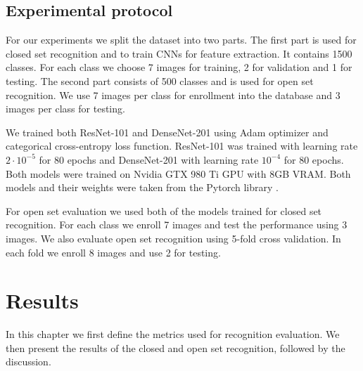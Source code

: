 \documentclass[9pt]{IEEEtran}
\begin{document}
\subsection{Experimental protocol}
\label{exp_prot}
For our experiments we split the dataset into two parts. The first part is used for closed set recognition and to train CNNs for feature extraction. It contains 1500 classes. For each class we choose 7 images for training, 2 for validation and 1 for testing. The second part consists of 500 classes and is used for open set recognition. We use 7 images per class for enrollment into the database and 3 images per class for testing.

We trained both ResNet-101 and DenseNet-201 using Adam optimizer and categorical cross-entropy loss function. ResNet-101 was trained with learning rate $2\cdot10^{-5}$ for $80$ epochs and DenseNet-201 with learning rate $10^{-4}$ for $80$ epochs. Both models were trained on Nvidia GTX 980 Ti GPU with 8GB VRAM. Both models and their weights were taken from the Pytorch library \cite{NEURIPS2019_9015}.

For open set evaluation we used both of the models trained for closed set recognition. For each class we enroll 7 images and test the performance using 3 images. We also evaluate open set recognition using 5-fold cross validation. In each fold we enroll 8 images and use 2 for testing.

\section{Results}
In this chapter we first define the metrics used for recognition evaluation. We then present the results of the closed and open set recognition, followed by the discussion.
\end{document}
